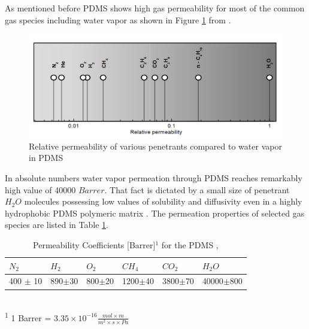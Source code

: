 As mentioned before PDMS shows high gas permeability for most of the common gas species including water vapor \cite{prado_polydimethylsiloxane_2008} as shown in Figure \ref{fig:PDMS_perm} from \cite{Metz}.

\begin{figure}[H]
\centering
\includegraphics[width=1\textwidth]{Figures/Theory/PDMS-relative-permeability.jpg}
\medskip
\captionsetup{width=1\linewidth}
\caption{Relative  permeability  of  various  penetrants  compared  to  water vapor in  PDMS \cite{Metz}}
\label{fig:PDMS_perm}
\end{figure}


In absolute numbers water vapor permeation through PDMS reaches remarkably high value of 40000 $Barrer$. That fact is dictated by a small size of penetrant $H_2O$ molecules possessing low values of solubility and diffusivity even in a highly hydrophobic PDMS polymeric matrix \cite{Metz}. The permeation properties of selected gas species are listed in Table \ref{tab:PDMS_perm}.

\begin{table}[H]
\centering
    \caption[Caption for LOF]{Permeability Coefficients [Barrer]$^1$ for the PDMS \cite{prado_polydimethylsiloxane_2008}, \cite{Metz}}
    
    \label{tab:PDMS_perm} 
\medskip
\medskip
\begin{tabular}{ l | l | l | l | l | l} 

$N_2$ & $H_2$ & $O_2$ & $CH_4$ & $CO_2$ & $H_2O$ \\[15px]
\hline

 400 $\pm$ 10 &  890$\pm$30 & 800$\pm$20 & 1200$\pm$40 & 3800$\pm$70 &  40000$\pm$800                            \\[15px]


\end{tabular}
\\[15px]
\small\textsuperscript{1} 1 Barrer = $3.35\times 10^{-16} \frac{mol \times m}{m^2 \times s \times Pa}$\\
\end{table}
%

